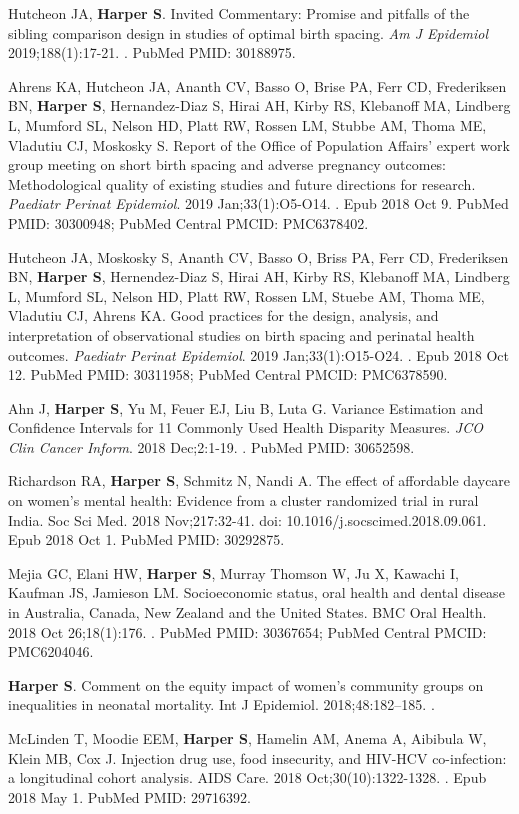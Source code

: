 \documentclass[
  letterpaper,
  DIV=11,
  numbers=noendperiod]{scrartcl}
\begin{document}
Hutcheon JA, \textbf{Harper S}. Invited Commentary: Promise and pitfalls
of the sibling comparison design in studies of optimal birth spacing.
\emph{Am J Epidemiol} 2019;188(1):17-21. . PubMed PMID: 30188975.

Ahrens KA, Hutcheon JA, Ananth CV, Basso O, Brise PA, Ferr CD,
Frederiksen BN, \textbf{Harper S}, Hernandez-Diaz S, Hirai AH, Kirby RS,
Klebanoff MA, Lindberg L, Mumford SL, Nelson HD, Platt RW, Rossen LM,
Stubbe AM, Thoma ME, Vladutiu CJ, Moskosky S. Report of the Office of
Population Affairs' expert work group meeting on short birth spacing and
adverse pregnancy outcomes: Methodological quality of existing studies
and future directions for research. \emph{Paediatr Perinat Epidemiol}.
2019 Jan;33(1):O5-O14. . Epub 2018 Oct 9. PubMed PMID: 30300948; PubMed
Central PMCID: PMC6378402.

Hutcheon JA, Moskosky S, Ananth CV, Basso O, Briss PA, Ferr CD,
Frederiksen BN, \textbf{Harper S}, Hernendez-Diaz S, Hirai AH, Kirby RS,
Klebanoff MA, Lindberg L, Mumford SL, Nelson HD, Platt RW, Rossen LM,
Stuebe AM, Thoma ME, Vladutiu CJ, Ahrens KA. Good practices for the
design, analysis, and interpretation of observational studies on birth
spacing and perinatal health outcomes. \emph{Paediatr Perinat
Epidemiol}. 2019 Jan;33(1):O15-O24. . Epub 2018 Oct 12. PubMed PMID:
30311958; PubMed Central PMCID: PMC6378590.

Ahn J, \textbf{Harper S}, Yu M, Feuer EJ, Liu B, Luta G. Variance
Estimation and Confidence Intervals for 11 Commonly Used Health
Disparity Measures. \emph{JCO Clin Cancer Inform}. 2018 Dec;2:1-19. .
PubMed PMID: 30652598.

Richardson RA, \textbf{Harper S}, Schmitz N, Nandi A. The effect of
affordable daycare on women's mental health: Evidence from a cluster
randomized trial in rural India. Soc Sci Med. 2018 Nov;217:32-41. doi:
10.1016/j.socscimed.2018.09.061. Epub 2018 Oct 1. PubMed PMID: 30292875.

Mejia GC, Elani HW, \textbf{Harper S}, Murray Thomson W, Ju X, Kawachi
I, Kaufman JS, Jamieson LM. Socioeconomic status, oral health and dental
disease in Australia, Canada, New Zealand and the United States. BMC
Oral Health. 2018 Oct 26;18(1):176. . PubMed PMID: 30367654; PubMed
Central PMCID: PMC6204046.

\textbf{Harper S}. Comment on the equity impact of women's community
groups on inequalities in neonatal mortality. Int J Epidemiol.
2018;48:182--185. .

McLinden T, Moodie EEM, \textbf{Harper S}, Hamelin AM, Anema A, Aibibula
W, Klein MB, Cox J. Injection drug use, food insecurity, and HIV-HCV
co-infection: a longitudinal cohort analysis. AIDS Care. 2018
Oct;30(10):1322-1328. . Epub 2018 May 1. PubMed PMID: 29716392.
\end{document}
